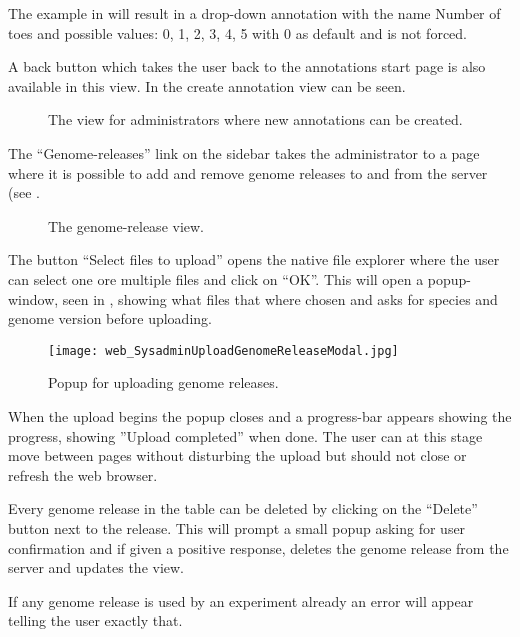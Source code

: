 The example in  will result in a drop-down annotation with the name Number of toes and possible values: 0, 1, 2, 3, 4, 5 with 0 as default and is not forced.

A back button which takes the user back to the annotations start page is also available in this view. In  the create annotation view can be seen.

\begin{figure}[t]
 \caption{The view for administrators where new annotations can be created.}
 \label{adm_web_createView}
\end{figure}

The “Genome-releases” link on the sidebar takes the administrator to a page where it is possible to add and remove genome releases to and from the server (see .

\begin{figure}[h]
 \caption{The genome-release view.}
 \label{adm_web_genomereleaseView}
\end{figure}

The button “Select files to upload” opens the native file explorer where the user can select one ore multiple files and click on “OK”. This will open a popup-window, seen in , showing what files that where chosen and asks for species and genome version before uploading. 

\begin{figure}[h]
 \centering
 \texttt{[image: web\_SysadminUploadGenomeReleaseModal.jpg]}
 \caption{Popup for uploading genome releases.}
 \label{adm_web_uploadconfirm}
\end{figure}

When the upload begins the popup closes and a progress-bar appears showing the progress, showing ''Upload completed'' when done. The user can at this stage move between pages without disturbing the upload but should not close or refresh the web browser. 

Every genome release in the table can be deleted by clicking on the “Delete” button next to the release. This will prompt a small popup asking for user confirmation and if given a positive response, deletes the genome release from the server and updates the view. 

If any genome release is used by an experiment already an error will appear telling the user exactly that. 

